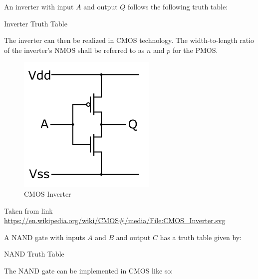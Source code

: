 An inverter with input $A$ and output $Q$ follows the following truth table:

\FloatBarrier

\begin{table}[h!]
	\centering
	\caption{Inverter Truth Table}
	\label{tab:inverter_tt}
\end{table}

\FloatBarrier

The inverter can then be realized in CMOS technology.
The width-to-length ratio of the inverter's NMOS shall be referred to as $n$ and $p$ for the PMOS.

\FloatBarrier

\begin{figure}[h!]
	\centering
	\includegraphics[scale=0.75]{./images/CMOS_Inverter.PNG}
	\caption{CMOS Inverter}
	\label{fig:CMOS_Inverter}
\end{figure}

\FloatBarrier

{\footnotesize Taken from link \url{https://en.wikipedia.org/wiki/CMOS#/media/File:CMOS_Inverter.svg}}

\FloatBarrier

A NAND gate with inputs $A$ and $B$ and output $C$ has a truth table given by:

\FloatBarrier

\begin{table}[h!]
	\centering
	\caption{NAND Truth Table}
	\label{tab:nand_tt}
\end{table}

\FloatBarrier

The NAND gate can be implemented in CMOS like so:

\FloatBarrier

